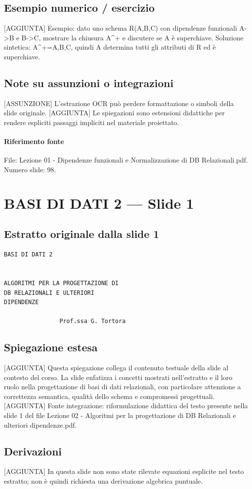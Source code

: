 \documentclass[11pt]{article}
\begin{document}
\subsection*{Esempio numerico / esercizio}
[AGGIUNTA] Esempio: dato uno schema R(A,B,C) con dipendenze funzionali A->B e B->C, mostrare la chiusura A^+ e discutere se A è superchiave. Soluzione sintetica: A^+={A,B,C}, quindi A determina tutti gli attributi di R ed è superchiave.
\subsection*{Note su assunzioni o integrazioni}
[ASSUNZIONE] L'estrazione OCR può perdere formattazione o simboli della slide originale.
[AGGIUNTA] Le spiegazioni sono estensioni didattiche per rendere espliciti passaggi impliciti nel materiale proiettato.
\paragraph{Riferimento fonte} File: Lezione 01 - Dipendenze funzionali e Normalizzazione di DB Relazionali.pdf. Numero slide: 98.
\section{BASI DI DATI 2 --- Slide 1}
\subsection*{Estratto originale dalla slide 1}
\begin{lstlisting}
BASI DI DATI 2


ALGORITMI PER LA PROGETTAZIONE DI
DB RELAZIONALI E ULTERIORI
DIPENDENZE

                Prof.ssa G. Tortora
\end{lstlisting}
\subsection*{Spiegazione estesa}
[AGGIUNTA] Questa spiegazione collega il contenuto testuale della slide al contesto del corso. La slide enfatizza i concetti mostrati nell'estratto e il loro ruolo nella progettazione di basi di dati relazionali, con particolare attenzione a correttezza semantica, qualità dello schema e compromessi progettuali.
[AGGIUNTA] Fonte integrazione: riformulazione didattica del testo presente nella slide 1 del file Lezione 02 - Algoritmi per la progettazione di DB Relazionali e ulteriori dipendenze.pdf.
\subsection*{Derivazioni}
[AGGIUNTA] In questa slide non sono state rilevate equazioni esplicite nel testo estratto; non è quindi richiesta una derivazione algebrica puntuale.
\end{document}
